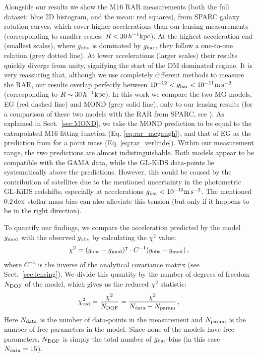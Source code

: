 \documentclass[usenatbib]{mnras}
\newcommand{\hkpc}{\, h^{-1}{\rm{kpc}} }
\newcommand{\mpss}{ {\rm m}\,{\rm s}^{-2} }
\newcommand{\un}[1]{_{\rm #1}}
\newcommand{\dex}{\, {\rm dex}}
\begin{document}
Alongside our results we show the M16 RAR measurements (both the full dataset: blue 2D histogram, and the mean: red squares), from SPARC galaxy rotation curves, which cover higher accelerations than our lensing measurements (corresponding to smaller scales: $R < 30 \hkpc$). At the highest acceleration end (smallest scales), where $g\un{obs}$ is dominated by $g\un{bar}$, they follow a one-to-one relation (grey dotted line). At lower accelerations (larger scales) their results quickly diverge from unity, signifying the start of the DM dominated regime. It is very reassuring that, although we use completely different methods to measure the RAR, our results overlap perfectly between $10^{-12} < g\un{bar} < 10^{-11} \mpss$ (corresponding to $R \sim 30 \hkpc$). In this work we compare the two MG models, EG (red dashed line) and MOND (grey solid line), only to our lensing results (for a comparison of these two models with the RAR from SPARC, see \citealt{lelli2017a}). As explained in Sect.~\ref{sec:MOND}, we take the MOND prediction to be equal to the extrapolated M16 fitting function (Eq. \ref{eq:rar_mcgaugh}), and that of EG as the prediction from \cite{verlinde2016} for a point mass (Eq. \ref{eq:rar_verlinde}). Within our measurement range, the two predictions are almost indistinguishable. Both models appear to be compatible with the GAMA data, while the GL-KiDS data-points lie systematically above the predictions. However, this could be caused by the contribution of satellites due to the mentioned uncertainty in the photometric GL-KiDS redshifts, especially at accelerations $g\un{bar} < 10^{-13} \mpss$. The mentioned $0.2 \dex$ stellar mass bias can also alleviate this tension (but only if it happens to be in the right direction).

To quantify our findings, we compare the acceleration predicted by the model $g\un{mod}$ with the observed $g\un{obs}$ by calculating the $\chi^2$ value:
\begin{equation}
\chi^2 = (g\un{obs} - g\un{mod})^\intercal \cdot C^{-1}(g\un{obs} - g\un{mod}) \, ,
\label{eq:chi2}
\end{equation}
where $C^{-1}$ is the inverse of the analytical covariance matrix (see Sect.~\ref{sec:lensing}). We divide this quantity by the number of degrees of freedom $N\un{DOF}$ of the model, which gives us the reduced $\chi^2$ statistic:
\begin{equation}
\chi\un{red}^2 = \frac{\chi^2}{N\un{DOF}} = \frac{\chi^2}{N\un{data} - N\un{param}} \, ,
\end{equation}
Here $N\un{data}$ is the number of data-points in the measurement and $N\un{param}$ is the number of free parameters in the model. Since none of the models have free parameters, $N\un{DOF}$ is simply the total number of $g\un{bar}$-bins (in this case $N\un{data}= 15$).
\end{document}
